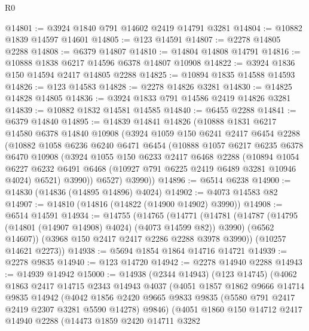 \begin{lexlean}{R0}
\begin{coremodule}
@14801 := @3924 @1840 @791 @14602 @2419 @14791 @3281
@14804 := @10882 @1839 @14597 @14601
@14805 := @123 @14591
@14807 := @2278 @14805 @2288
@14808 := @6379 @14807
@14810 := @14804 @14808 @14791
@14816 := @10888 @1838 @6217 @14596 @6378 @14807 @10908
@14822 := @3924 @1836 @150 @14594 @2417 @14805 @2288
@14825 := @10894 @1835 @14588 @14593
@14826 := @123 @14583
@14828 := @2278 @14826 @3281
@14830 := @14825 @14828 @14805
@14836 := @3924 @1833 @791 @14586 @2419 @14826 @3281
@14839 := @10882 @1832 @14581 @14585
@14840 := @6455 @2288
@14841 := @6379 @14840
@14895 := @14839
    @14841
    @14826
    (@10888
      @1831
      @6217
      @14580
      @6378
      @14840
      @10908
      (@3924
        @1059
        @150
        @6241
        @2417
        @6454
        @2288
        (@10882
          @1058
          @6236
          @6240
          @6471
          @6454
          (@10888
            @1057
            @6217
            @6235
            @6378
            @6470
            @10908
            (@3924
              @1055
              @150
              @6233
              @2417
              @6468
              @2288
              (@10894
                @1054
                @6227
                @6232
                @6491
                @6468
                (@10927 @791 @6225 @2419 @6489 @3281 @10946 @4024)
                @6521)
              @3990))
          @6527)
        @3990))
@14896 := @6514 @6238
@14900 := @14830 (@14836 (@14895 @14896) @4024)
@14902 := @4073 @14583 @82
@14907 := @14810 (@14816 (@14822 (@14900 @14902) @3990))
@14908 := @6514 @14591
@14934 := @14755
    (@14765
      (@14771
        (@14781
          (@14787 (@14795 (@14801 (@14907 @14908) @4024) (@4073 @14599 @82)) @3990)
          (@6562 @14607))
        (@3968 @150 @2417 @2417 @2286 @2288 @3978 @3990))
      (@10257 @14621 @2273))
@14938 := @5694 @1854 @1864 @14716 @14721
@14939 := @2278 @9835
@14940 := @123 @14720
@14942 := @2278 @14940 @2288
@14943 := @14939 @14942
@15000 := @14938
    (@2344 @14943)
    (@123 @14745)
    (@4062
      @1863
      @2417
      @14715
      @2343
      @14943
      @4037
      (@4051
        @1857
        @1862
        @9666
        @14714
        @9835
        @14942
        (@4042
          @1856
          @2420
          @9665
          @9833
          @9835
          (@5580 @791 @2417 @2419 @2307 @3281 @5590 @14278)
          @9846)
        (@4051
          @1860
          @150
          @14712
          @2417
          @14940
          @2288
          (@14473
            @1859
            @2420
            @14711
            @3282

\end{coremodule}
\end{lexlean}
